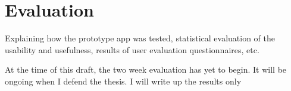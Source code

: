 \chapter{Evaluation}

Explaining how the prototype app was tested, statistical evaluation of the usability and usefulness, results of user evaluation questionnaires, etc.

At the time of this draft, the two week evaluation has yet to begin. It will be ongoing when I defend the thesis. I will write up the results only 